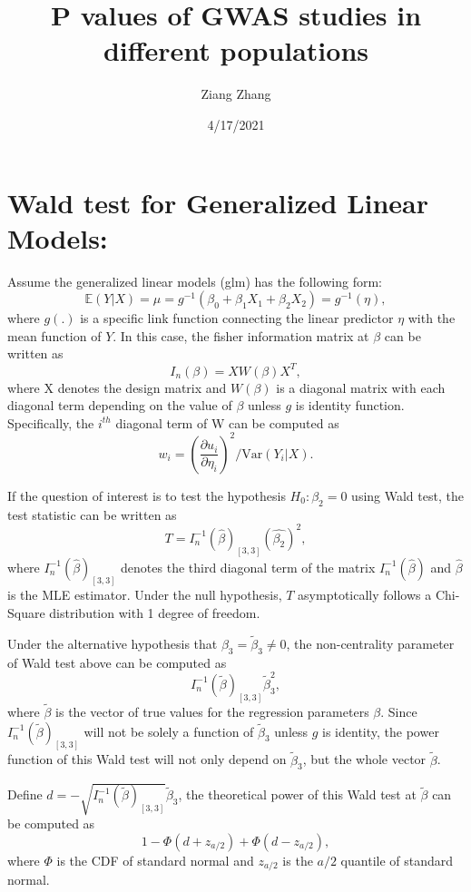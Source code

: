 \documentclass[
]{article}
\title{\textbf{P values of GWAS studies in different populations}}
\author{Ziang Zhang}
\date{4/17/2021}
\begin{document}
\maketitle

\newcommand{\p}{\text{P}}
\newcommand{\E}{\mathbb{E}}
\newcommand{\Var}{\text{Var}}

\hypertarget{wald-test-for-generalized-linear-models}{%
\section{Wald test for Generalized Linear
Models:}\label{wald-test-for-generalized-linear-models}}

Assume the generalized linear models (glm) has the following form:
\[\mathbb{E}(Y|X) = \mu = g^{-1}(\beta_0 + \beta_1 X_1 + \beta_2X_2) = g^{-1}(\eta),\]
where \(g(.)\) is a specific link function connecting the linear
predictor \(\eta\) with the mean function of \(Y\). In this case, the
fisher information matrix at \(\beta\) can be written as
\[I_n(\beta) = XW(\beta) X^T,\] where X denotes the design matrix and
\(W(\beta)\) is a diagonal matrix with each diagonal term depending on
the value of \(\beta\) unless \(g\) is identity function. Specifically,
the \(i^{th}\) diagonal term of W can be computed as
\[w_i=(\frac{\partial u_i}{\partial\eta_i})^2/\text{Var}(Y_i|X).\]

If the question of interest is to test the hypothesis \(H_0: \beta_2=0\)
using Wald test, the test statistic can be written as
\[T = I_n^{-1}(\hat{\beta})_{[3,3]}(\hat{\beta_2})^2,\] where
\(I_n^{-1}(\hat{\beta})_{[3,3]}\) denotes the third diagonal term of the
matrix \(I_n^{-1}(\hat{\beta})\) and \(\hat{\beta}\) is the MLE
estimator. Under the null hypothesis, \(T\) asymptotically follows a
Chi-Square distribution with 1 degree of freedom.

Under the alternative hypothesis that
\(\beta_3 = \tilde{\beta}_3 \neq 0\), the non-centrality parameter of
Wald test above can be computed as
\[I_n^{-1}(\tilde{\beta})_{[3,3]}\tilde{\beta}_3^2,\] where
\(\tilde{\beta}\) is the vector of true values for the regression
parameters \(\beta\). Since \(I_n^{-1}(\tilde{\beta})_{[3,3]}\) will not
be solely a function of \(\tilde{\beta}_3\) unless \(g\) is identity,
the power function of this Wald test will not only depend on
\(\tilde{\beta}_3\), but the whole vector \(\tilde{\beta}\).

Define \(d=-\sqrt{I_n^{-1}(\tilde{\beta})_{[3,3]}}\tilde{\beta}_3\), the
theoretical power of this Wald test at \(\tilde{\beta}\) can be computed
as \[1-\Phi(d+z_{a/2})+\Phi(d-z_{a/2}),\] where \(\Phi\) is the CDF of
standard normal and \(z_{a/2}\) is the \(a/2\) quantile of standard
normal.
\end{document}
